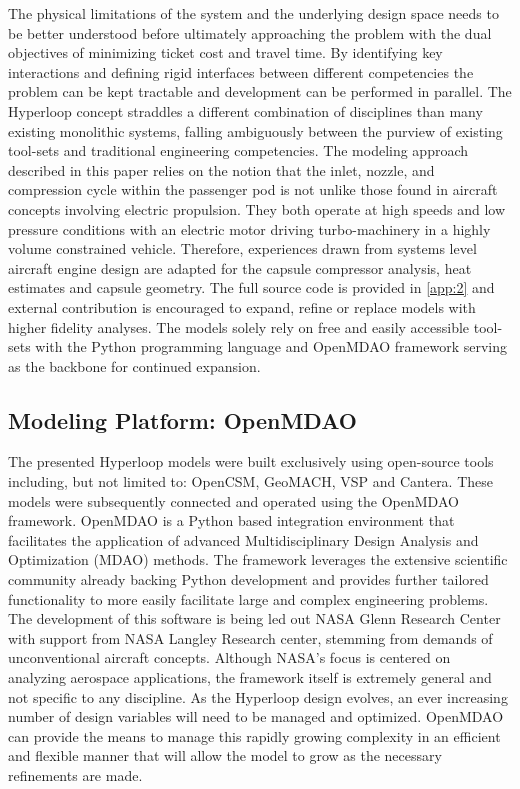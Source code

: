 \documentclass[heading.tex]{subfiles}
\begin{document}
The physical limitations of the system and the underlying design space needs to be better understood before ultimately approaching the
problem with the dual objectives of minimizing ticket cost and travel time. By identifying key interactions and defining rigid interfaces between
different competencies the problem can
be kept tractable and development can be performed in parallel. The Hyperloop concept straddles a different combination of disciplines than many
existing monolithic systems, falling ambiguously between the purview of existing tool-sets and traditional engineering competencies. The modeling
approach described in this paper relies on the notion that the inlet, nozzle, and compression cycle within the passenger pod is not unlike those
found in aircraft concepts involving electric propulsion. They both operate at high speeds and low pressure conditions with an electric motor
driving turbo-machinery in a highly volume constrained vehicle. Therefore, experiences drawn from systems level aircraft engine
design are adapted for the capsule compressor analysis, heat estimates and capsule geometry. The full source code is provided in
 \cref{app:2} and external contribution is encouraged to expand, refine or replace models with higher fidelity analyses. The models solely rely on
free and easily accessible tool-sets with the Python programming language and OpenMDAO framework serving as the backbone for continued expansion.  

\subsection{Modeling Platform: OpenMDAO}


The presented Hyperloop models were built exclusively using open-source tools including, but not limited to: OpenCSM, GeoMACH, VSP and
Cantera. These models were subsequently connected and operated using the OpenMDAO framework. OpenMDAO is a Python based
integration environment that facilitates the application of advanced Multidisciplinary Design Analysis and Optimization (MDAO) methods.
The framework leverages the extensive scientific community already backing Python development and provides further tailored functionality
to more easily facilitate large and complex engineering problems. The development of this software is being led out NASA Glenn Research
Center with support from NASA Langley Research center, stemming from demands of unconventional aircraft concepts. Although NASA's
focus is centered on analyzing aerospace applications, the framework itself is extremely general and not specific to any discipline. As the
Hyperloop design evolves, an ever increasing number of design variables will need to be managed and optimized. OpenMDAO can provide
the means to manage this rapidly growing complexity in an efficient and flexible manner that will allow the model to grow as the necessary
refinements are made.
\end{document}
